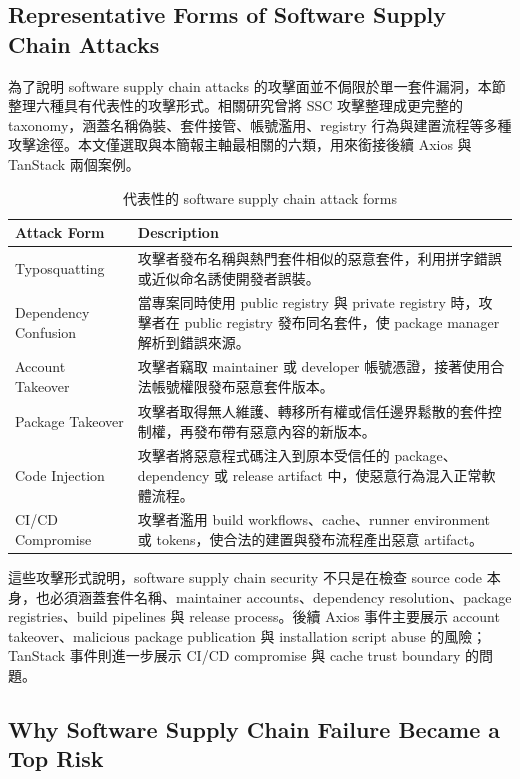 \documentclass[12pt,a4paper]{article}
\begin{document}
\subsection{Representative Forms of Software Supply Chain Attacks}

為了說明 software supply chain attacks 的攻擊面並不侷限於單一套件漏洞，本節整理六種具有代表性的攻擊形式。相關研究曾將 SSC 攻擊整理成更完整的 taxonomy，涵蓋名稱偽裝、套件接管、帳號濫用、registry 行為與建置流程等多種攻擊途徑\cite{ssc-taxonomy}。本文僅選取與本簡報主軸最相關的六類，用來銜接後續 Axios 與 TanStack 兩個案例。

\begin{table}[h]
\centering
\caption{代表性的 software supply chain attack forms}
\begin{tabularx}{\textwidth}{P{4cm}Y}
\toprule
\textbf{Attack Form} & \textbf{Description} \\
\midrule
Typosquatting & 攻擊者發布名稱與熱門套件相似的惡意套件，利用拼字錯誤或近似命名誘使開發者誤裝。 \\
Dependency Confusion & 當專案同時使用 public registry 與 private registry 時，攻擊者在 public registry 發布同名套件，使 package manager 解析到錯誤來源。 \\
Account Takeover & 攻擊者竊取 maintainer 或 developer 帳號憑證，接著使用合法帳號權限發布惡意套件版本。 \\
Package Takeover & 攻擊者取得無人維護、轉移所有權或信任邊界鬆散的套件控制權，再發布帶有惡意內容的新版本。 \\
Code Injection & 攻擊者將惡意程式碼注入到原本受信任的 package、dependency 或 release artifact 中，使惡意行為混入正常軟體流程。 \\
CI/CD Compromise & 攻擊者濫用 build workflows、cache、runner environment 或 tokens，使合法的建置與發布流程產出惡意 artifact。 \\
\bottomrule
\end{tabularx}
\end{table}

這些攻擊形式說明，software supply chain security 不只是在檢查 source code 本身，也必須涵蓋套件名稱、maintainer accounts、dependency resolution、package registries、build pipelines 與 release process。後續 Axios 事件主要展示 account takeover、malicious package publication 與 installation script abuse 的風險；TanStack 事件則進一步展示 CI/CD compromise 與 cache trust boundary 的問題。

\subsection{Why Software Supply Chain Failure Became a Top Risk}
\end{document}
